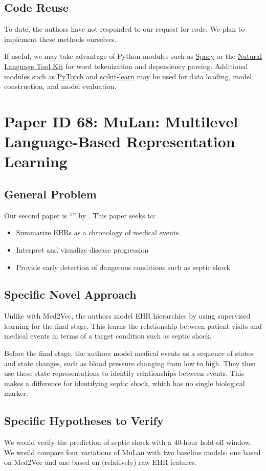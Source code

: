 \documentclass[11pt,a4paper]{article}
\begin{document}
\subsection{Code Reuse}
To date, the authors have not responded to our request for code. We plan to implement these methods ourselves. 

If useful, we may take advantage of Python modules such as \href{https://spacy.io/}{Spacy} or the \href{https://www.nltk.org/}{Natural Language Tool Kit} for word tokenization and dependency parsing. Additional modules such as \href{https://pytorch.org/}{PyTorch} and \href{https://scikit-learn.org/stable/}{scikit-learn} may be used for data loading, model construction, and model evaluation. 

\section{Paper ID 68: MuLan: Multilevel Language-Based Representation Learning}
\subsection{General Problem}
Our second paper is ``'' by \citeauthor*{sohn_2020}. This paper seeks to:
\begin{itemize}
  \item Summarize EHRs as a chronology of medical events
  \item Interpret and visualize disease progression
  \item Provide early detection of dangerous conditions such as septic shock
\end{itemize}

\subsection{Specific Novel Approach}
Unlike with Med2Vec, the authors model EHR hierarchies by using supervised learning for the final stage. This learns the relationship between patient visits and medical events in terms of a target condition such as septic shock.

Before the final stage, the authors model medical events as a sequence of states and state changes, such as blood pressure changing from low to high. They then use these state representations to identify relationships between events. This makes a difference for identifying septic shock, which has no single biological marker.

\subsection{Specific Hypotheses to Verify}
We would verify the prediction of septic shock with a 40-hour hold-off window. We would compare four variations of MuLan with two baseline models: one based on Med2Vec and one based on (relatively) raw EHR features.
\end{document}
